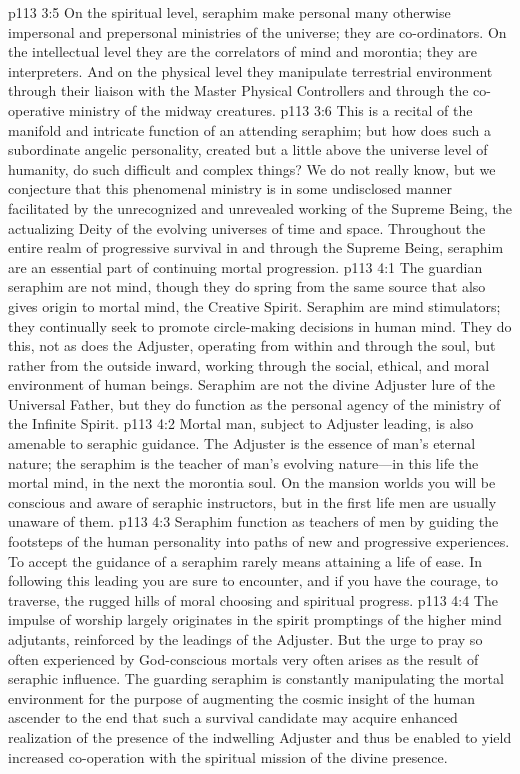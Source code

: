 \vs p113 3:5 On the spiritual level, seraphim make personal many otherwise impersonal and prepersonal ministries of the universe; they are co\hyp{}ordinators. On the intellectual level they are the correlators of mind and morontia; they are interpreters. And on the physical level they manipulate terrestrial environment through their liaison with the Master Physical Controllers and through the co\hyp{}operative ministry of the midway creatures.
\vs p113 3:6 This is a recital of the manifold and intricate function of an attending seraphim; but how does such a subordinate angelic personality, created but a little above the universe level of humanity, do such difficult and complex things? We do not really know, but we conjecture that this phenomenal ministry is in some undisclosed manner facilitated by the unrecognized and unrevealed working of the Supreme Being, the actualizing Deity of the evolving universes of time and space. Throughout the entire realm of progressive survival in and through the Supreme Being, seraphim are an essential part of continuing mortal progression.
\vs p113 4:1 The guardian seraphim are not mind, though they do spring from the same source that also gives origin to mortal mind, the Creative Spirit. Seraphim are mind stimulators; they continually seek to promote circle\hyp{}making decisions in human mind. They do this, not as does the Adjuster, operating from within and through the soul, but rather from the outside inward, working through the social, ethical, and moral environment of human beings. Seraphim are not the divine Adjuster lure of the Universal Father, but they do function as the personal agency of the ministry of the Infinite Spirit.
\vs p113 4:2 Mortal man, subject to Adjuster leading, is also amenable to seraphic guidance. The Adjuster is the essence of man’s eternal nature; the seraphim is the teacher of man’s evolving nature---in this life the mortal mind, in the next the morontia soul. On the mansion worlds you will be conscious and aware of seraphic instructors, but in the first life men are usually unaware of them.
\vs p113 4:3 Seraphim function as teachers of men by guiding the footsteps of the human personality into paths of new and progressive experiences. To accept the guidance of a seraphim rarely means attaining a life of ease. In following this leading you are sure to encounter, and if you have the courage, to traverse, the rugged hills of moral choosing and spiritual progress.
\vs p113 4:4 The impulse of worship largely originates in the spirit promptings of the higher mind adjutants, reinforced by the leadings of the Adjuster. But the urge to pray so often experienced by God\hyp{}conscious mortals very often arises as the result of seraphic influence. The guarding seraphim is constantly manipulating the mortal environment for the purpose of augmenting the cosmic insight of the human ascender to the end that such a survival candidate may acquire enhanced realization of the presence of the indwelling Adjuster and thus be enabled to yield increased co\hyp{}operation with the spiritual mission of the divine presence.
